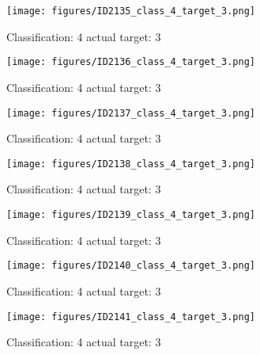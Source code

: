 \begin{figure}[h!]
\begin{center}
\texttt{[image: figures/ID2135\_class\_4\_target\_3.png]}
\end{center}
\caption{ Classification: 4 actual target: 3}
\label{fig:ID2135_class_4_target_3}
\end{figure}
\begin{figure}[h!]
\begin{center}
\texttt{[image: figures/ID2136\_class\_4\_target\_3.png]}
\end{center}
\caption{ Classification: 4 actual target: 3}
\label{fig:ID2136_class_4_target_3}
\end{figure}
\begin{figure}[h!]
\begin{center}
\texttt{[image: figures/ID2137\_class\_4\_target\_3.png]}
\end{center}
\caption{ Classification: 4 actual target: 3}
\label{fig:ID2137_class_4_target_3}
\end{figure}
\begin{figure}[h!]
\begin{center}
\texttt{[image: figures/ID2138\_class\_4\_target\_3.png]}
\end{center}
\caption{ Classification: 4 actual target: 3}
\label{fig:ID2138_class_4_target_3}
\end{figure}
\begin{figure}[h!]
\begin{center}
\texttt{[image: figures/ID2139\_class\_4\_target\_3.png]}
\end{center}
\caption{ Classification: 4 actual target: 3}
\label{fig:ID2139_class_4_target_3}
\end{figure}
\begin{figure}[h!]
\begin{center}
\texttt{[image: figures/ID2140\_class\_4\_target\_3.png]}
\end{center}
\caption{ Classification: 4 actual target: 3}
\label{fig:ID2140_class_4_target_3}
\end{figure}
\begin{figure}[h!]
\begin{center}
\texttt{[image: figures/ID2141\_class\_4\_target\_3.png]}
\end{center}
\caption{ Classification: 4 actual target: 3}
\label{fig:ID2141_class_4_target_3}
\end{figure}
